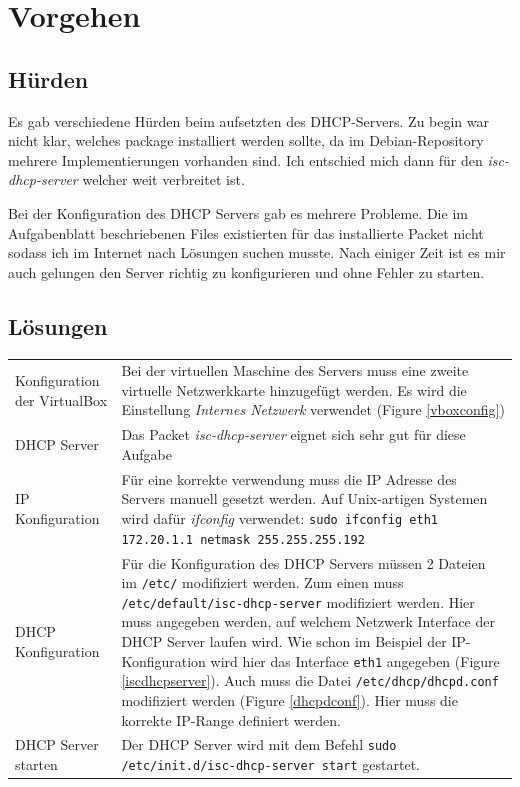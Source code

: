\documentclass[12pt,a4paper,twoside,titlepage]{article}
\begin{document}
        \section{Vorgehen}

        \subsection{Hürden}

        Es gab verschiedene Hürden beim aufsetzten des DHCP-Servers. Zu begin war nicht klar, welches package installiert werden sollte, da im Debian-Repository mehrere Implementierungen vorhanden sind. Ich entschied mich dann für den \textit{isc-dhcp-server} welcher weit verbreitet ist.
        
        Bei der Konfiguration des DHCP Servers gab es mehrere Probleme. Die im Aufgabenblatt beschriebenen Files existierten für das installierte Packet nicht sodass ich im Internet nach Lösungen suchen musste. Nach einiger Zeit ist es mir auch gelungen den Server richtig zu konfigurieren und ohne Fehler zu starten.
        \subsection{Lösungen}
        
        
        \begin{tabular}{lp{10cm}}
        	Konfiguration der VirtualBox & Bei der virtuellen Maschine des Servers muss eine zweite virtuelle Netzwerkkarte hinzugefügt werden. Es wird die Einstellung \textit{Internes Netzwerk} verwendet (Figure \ref{vboxconfig})\\
            DHCP Server & Das Packet \textit{isc-dhcp-server} eignet sich sehr gut für diese Aufgabe \\
            IP Konfiguration & Für eine korrekte verwendung muss die IP Adresse des Servers manuell gesetzt werden. Auf Unix-artigen Systemen wird dafür \textit{ifconfig} verwendet: \texttt{sudo ifconfig eth1 172.20.1.1 netmask 255.255.255.192}\\
            DHCP Konfiguration & Für die Konfiguration des DHCP Servers müssen 2 Dateien im \texttt{/etc/} modifiziert werden. Zum einen muss \texttt{/etc/default/isc-dhcp-server} modifiziert werden. Hier muss angegeben werden, auf welchem Netzwerk Interface der DHCP Server laufen wird. Wie schon im Beispiel der IP-Konfiguration wird hier das Interface \texttt{eth1} angegeben (Figure \ref{iscdhcpserver}). Auch muss die Datei \texttt{/etc/dhcp/dhcpd.conf} modifiziert werden (Figure \ref{dhcpdconf}). Hier muss die korrekte IP-Range definiert werden.\\
	        DHCP Server starten & Der DHCP Server wird mit dem Befehl \texttt{sudo /etc/init.d/isc-dhcp-server start} gestartet.\\
        \end{tabular}
        
\end{document}
